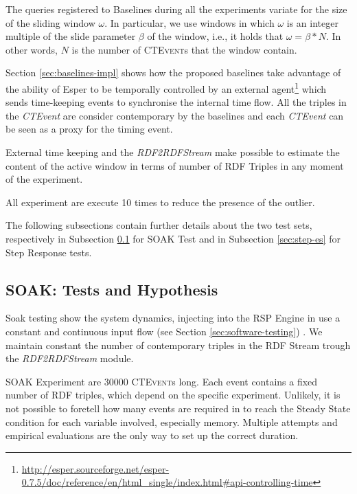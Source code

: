 The queries registered to \name Baselines during all the experiments variate for the size of the sliding window $\omega$. In particular, we use windows in which $\omega$ is an integer multiple of the slide parameter $\beta$ of the window, i.e., it holds that $\omega = \beta * N$. In other words, $N$ is the number of \textsc{CTEvent}s that the window contain. 

Section \ref{sec:baselines-impl} shows how the proposed baselines take advantage of the ability of Esper to be temporally controlled by an external agent\footnote{\url{http://esper.sourceforge.net/esper-0.7.5/doc/reference/en/html_single/index.html#api-controlling-time}} which sends time-keeping events to synchronise the internal time flow. All the triples in the \textit{CTEvent} are consider contemporary by the baselines and each \textit{CTEvent} can be seen as a proxy for the timing event. 

External time keeping and the \textit{RDF2RDFStream} make possible to estimate the content of the active window in terms of number of RDF Triples in any moment of the experiment.

All experiment are execute 10 times to reduce the presence of the outlier.

The following subsections contain further details about the two test sets, respectively in Subsection \ref{sec:soak-es} for SOAK Test and in Subsection \ref{sec:step-es} for Step Response tests.

\subsection{SOAK: Tests and Hypothesis}\label{sec:soak-es}

Soak testing show the system dynamics, injecting into the RSP Engine in use a constant and continuous input flow (see Section \ref{sec:software-testing}) . We maintain constant the number of contemporary triples in the RDF Stream trough the \textit{RDF2RDFStream} module. %

SOAK Experiment are 30000 \textsc{CTEvent}s long. Each event contains a fixed number of RDF triples, which depend on the specific experiment. Unlikely, it is not possible to foretell how many events are required in to reach the Steady State condition for each variable involved, especially memory. Multiple attempts and empirical evaluations are the only way to set up the correct duration.

